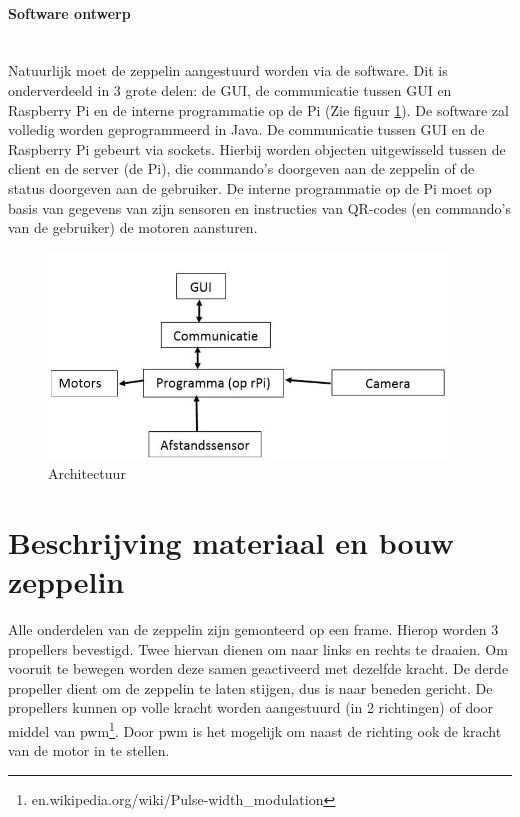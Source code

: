 \documentclass[tt]{penoverslag}
\begin{document}
\paragraph{Software ontwerp}
~\\
Natuurlijk moet de zeppelin aangestuurd worden via de software. Dit is onderverdeeld in 3 grote delen: de GUI, de communicatie tussen GUI en Raspberry Pi en de interne programmatie op de Pi (Zie figuur \ref{schema}). De software zal volledig worden geprogrammeerd in Java. 
De communicatie tussen GUI en de Raspberry Pi gebeurt via sockets. Hierbij worden objecten uitgewisseld tussen de client en de server (de Pi), die commando's doorgeven aan de zeppelin of de status doorgeven aan de gebruiker. De interne programmatie op de Pi moet op basis van gegevens van zijn sensoren en instructies van QR-codes (en commando's van de gebruiker) de motoren aansturen. 

\begin{figure}[ht!]
\centering
\includegraphics[height=55mm]{Schema.jpg}
\caption{Architectuur}
\label{schema}
\end{figure}


\section{Beschrijving materiaal en bouw zeppelin}
Alle onderdelen van de zeppelin zijn gemonteerd op een frame. Hierop worden 3 propellers bevestigd. Twee hiervan dienen om naar links en rechts te draaien. Om vooruit te bewegen worden deze samen geactiveerd met dezelfde kracht. De derde propeller dient om de zeppelin te laten stijgen, dus is naar beneden gericht. De propellers kunnen op volle kracht worden aangestuurd (in 2 richtingen) of door middel van pwm\footnote{en.wikipedia.org/wiki/Pulse-width\_modulation}. Door pwm is het mogelijk om naast de richting ook de kracht van de motor in te stellen.~\\
\end{document}
